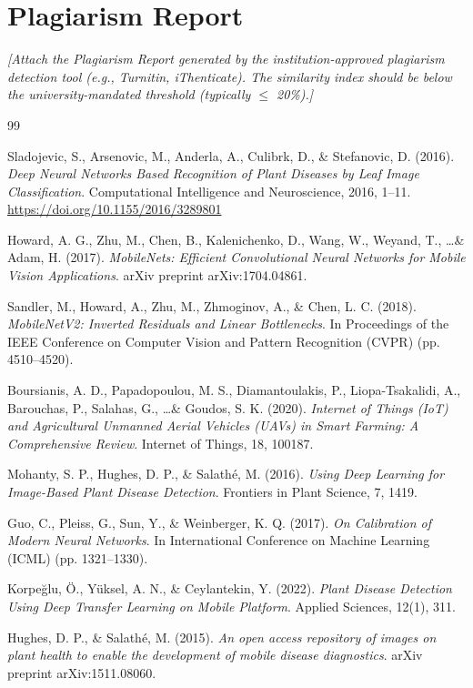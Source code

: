 \documentclass[12pt,a4paper]{report}
\begin{document}
\chapter{Plagiarism Report}
\textit{[Attach the Plagiarism Report generated by the institution-approved plagiarism detection tool (e.g., Turnitin, iThenticate). The similarity index should be below the university-mandated threshold (typically $\leq$ 20\%).]}

\newpage

\begin{thebibliography}{99}

Sladojevic, S., Arsenovic, M., Anderla, A., Culibrk, D., \& Stefanovic, D. (2016).
\textit{Deep Neural Networks Based Recognition of Plant Diseases by Leaf Image Classification}.
Computational Intelligence and Neuroscience, 2016, 1--11.
\url{https://doi.org/10.1155/2016/3289801}

Howard, A. G., Zhu, M., Chen, B., Kalenichenko, D., Wang, W., Weyand, T., \ldots \& Adam, H. (2017).
\textit{MobileNets: Efficient Convolutional Neural Networks for Mobile Vision Applications}.
arXiv preprint arXiv:1704.04861.

Sandler, M., Howard, A., Zhu, M., Zhmoginov, A., \& Chen, L. C. (2018).
\textit{MobileNetV2: Inverted Residuals and Linear Bottlenecks}.
In Proceedings of the IEEE Conference on Computer Vision and Pattern Recognition (CVPR) (pp. 4510--4520).

Boursianis, A. D., Papadopoulou, M. S., Diamantoulakis, P., Liopa-Tsakalidi, A., Barouchas, P., Salahas, G., \ldots \& Goudos, S. K. (2020).
\textit{Internet of Things (IoT) and Agricultural Unmanned Aerial Vehicles (UAVs) in Smart Farming: A Comprehensive Review}.
Internet of Things, 18, 100187.

Mohanty, S. P., Hughes, D. P., \& Salath\'{e}, M. (2016).
\textit{Using Deep Learning for Image-Based Plant Disease Detection}.
Frontiers in Plant Science, 7, 1419.

Guo, C., Pleiss, G., Sun, Y., \& Weinberger, K. Q. (2017).
\textit{On Calibration of Modern Neural Networks}.
In International Conference on Machine Learning (ICML) (pp. 1321--1330).

Korpe\u{g}lu, \"{O}., Y\"{u}ksel, A. N., \& Ceylantekin, Y. (2022).
\textit{Plant Disease Detection Using Deep Transfer Learning on Mobile Platform}.
Applied Sciences, 12(1), 311.

Hughes, D. P., \& Salath\'{e}, M. (2015).
\textit{An open access repository of images on plant health to enable the development of mobile disease diagnostics}.
arXiv preprint arXiv:1511.08060.

\end{thebibliography}
\end{document}
